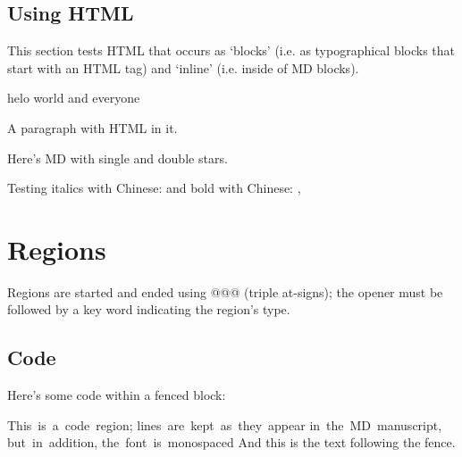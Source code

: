 \section{Using HTML
}
\begin{multicols}{2}This section tests HTML that occurs as ‘blocks’ (i.e. as typographical blocks
that start with an HTML tag) and ‘inline’ (i.e. inside of MD blocks).\mktsShowpar\par
helo {\mktsStyleItalic{}world\/} and {\mktsStyleBold{}everyone}\mktsShowpar\par
A paragraph with {\/} HTML in it.\mktsShowpar\par
Here’s MD with {\mktsStyleItalic{}single\/} and {\mktsStyleBold{}double} stars.\mktsShowpar\par
Testing {\mktsStyleItalic{}italics with Chinese: \/} and {\mktsStyleBold{}bold with Chinese: , }\mktsShowpar\par
\end{multicols}
\chapter{Regions
}
\begin{multicols}{2}Regions are started and ended using {\mktsStyleCode{}@@@} (triple at-signs); the opener
must be followed by a key word indicating the region’s type.\mktsShowpar\par
\end{multicols}
\section{Code
}
\begin{multicols}{2}Here’s {\mktsStyleCode{}some code} within a fenced block:\mktsShowpar\par
\begingroup\obeyalllines\mktsStyleCode{}This is a code region;
lines are kept as they appear
in the MD manuscript,
but in addition,
the font is monospaced
\endgroup{}And this is the text following the fence.\mktsShowpar\par
\end{multicols}
